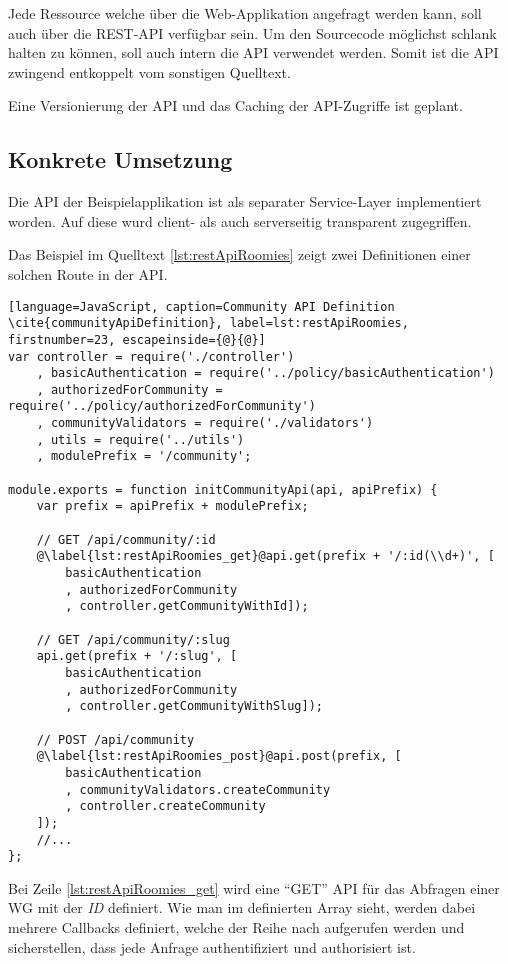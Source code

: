 Jede Ressource welche über die Web-Applikation angefragt werden kann, soll auch über die REST-API verfügbar sein. Um den Sourcecode möglichst schlank halten zu können, soll auch intern die API verwendet werden.
Somit ist die API zwingend entkoppelt vom sonstigen Quelltext.

Eine Versionierung der API und das Caching der API-Zugriffe ist geplant.

\subsection*{Konkrete Umsetzung}
\label{sec:principle-rp1-rest-concrete-solution}
Die API der Beispielapplikation ist als separater Service-Layer implementiert worden. Auf diese wurd client- als auch serverseitig transparent zugegriffen.

Das Beispiel im Quelltext \ref{lst:restApiRoomies} zeigt zwei Definitionen einer solchen Route in der API.

\begin{lstlisting}[language=JavaScript, caption=Community API Definition \cite{communityApiDefinition}, label=lst:restApiRoomies, firstnumber=23, escapeinside={@}{@}]
var controller = require('./controller')
	, basicAuthentication = require('../policy/basicAuthentication')
	, authorizedForCommunity = require('../policy/authorizedForCommunity')
	, communityValidators = require('./validators')
	, utils = require('../utils')
	, modulePrefix = '/community';

module.exports = function initCommunityApi(api, apiPrefix) {
	var prefix = apiPrefix + modulePrefix;

	// GET /api/community/:id
	@\label{lst:restApiRoomies_get}@api.get(prefix + '/:id(\\d+)', [
		basicAuthentication
		, authorizedForCommunity
		, controller.getCommunityWithId]);

	// GET /api/community/:slug
	api.get(prefix + '/:slug', [
		basicAuthentication
		, authorizedForCommunity
		, controller.getCommunityWithSlug]);

	// POST /api/community
	@\label{lst:restApiRoomies_post}@api.post(prefix, [
		basicAuthentication
		, communityValidators.createCommunity
		, controller.createCommunity
	]);
	//...
};
\end{lstlisting}

Bei Zeile \autoref{lst:restApiRoomies_get} wird eine ``GET'' API für das Abfragen einer WG mit der \emph{ID} definiert. Wie man im definierten Array sieht, werden dabei mehrere Callbacks definiert, welche der Reihe nach aufgerufen werden und sicherstellen, dass jede Anfrage authentifiziert und authorisiert ist.

